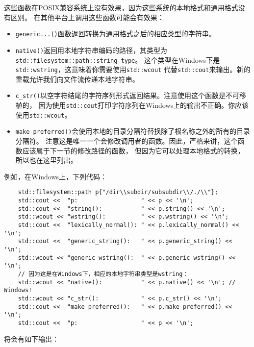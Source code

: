 这些函数在POSIX兼容系统上没有效果，因为这些系统的本地格式和通用格式没有区别。
在其他平台上调用这些函数可能会有效果：
\begin{itemize}
    \item \texttt{generic...()}函数返回转换为\hyperref[ch20.2.3]{通用格式}之后的相应类型的字符串。
    \item \texttt{native()}返回用本地字符串编码的路径，其类型为\texttt{std::filesystem::path::string\_type}。
    这个类型在Windows下是\texttt{std::wstring}，这意味着你需要使用\texttt{std::wcout}
    代替\texttt{std::cout}来输出。新的重载允许我们向文件流传递本地字符串。
    \item \texttt{c\_str()}以空字符结尾的字符序列形式返回结果。注意使用这个函数是不可移植的，
    因为使用\texttt{std::cout}打印字符序列在Windows上的输出不正确。你应该使用\texttt{std::wcout}。
    \item \texttt{make\_preferred()}会使用本地的目录分隔符替换除了根名称之外的所有的目录分隔符。
    注意这是唯一一个会修改调用者的函数。因此，严格来讲，这个函数应该属于下一节的修改路径的函数，
    但因为它可以处理本地格式的转换，所以也在这里列出。
\end{itemize}
例如，在Windows上，下列代码：
\begin{lstlisting}
    std::filesystem::path p{"/dir\\subdir/subsubdir\\/./\\"};
    std::cout <<  "p:                  " << p << '\n';
    std::cout <<  "string():           " << p.string() << '\n';
    std::wcout << "wstring():          " << p.wstring() << '\n';
    std::cout <<  "lexically_normal(): " << p.lexically_normal() << '\n';
    std::cout <<  "generic_string():   " << p.generic_string() << '\n';
    std::wcout << "generic_wstring():  " << p.generic_wstring() << '\n';
    // 因为这是在Windows下，相应的本地字符串类型是wstring：
    std::wcout << "native():           " << p.native() << '\n'; // Windows!
    std::wcout << "c_str():            " << p.c_str() << '\n';
    std::cout <<  "make_preferred():   " << p.make_preferred() << '\n';
    std::cout <<  "p:                  " << p << '\n';
\end{lstlisting}
将会有如下输出：
